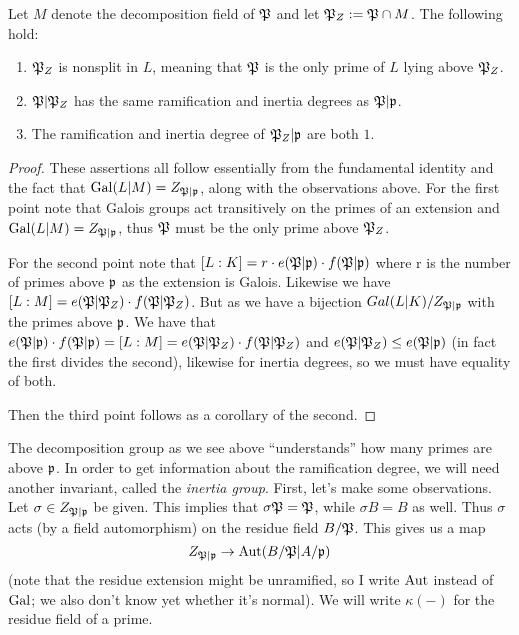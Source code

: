 \begin{proposition}
  Let $M$ denote the decomposition field of $\mathfrak{P}$ and let $\mathfrak{P}_{Z} := \mathfrak{P} \cap M$.
  The following hold:
  \begin{enumerate}
    \item $\mathfrak{P}_{Z}$ is nonsplit in $L$, meaning that $\mathfrak{P}$ is the only prime of $L$ lying above $\mathfrak{P}_{Z}$.
    \item $\mathfrak{P}|\mathfrak{P}_{Z}$ has the same ramification and inertia degrees as $\mathfrak{P}|\mathfrak{p}$.
    \item The ramification and inertia degree of $\mathfrak{P}_{Z}|\mathfrak{p}$ are both $1$.
  \end{enumerate}
\end{proposition}
\begin{proof}
  These assertions all follow essentially from the fundamental identity and the fact that $\operatorname{Gal}(L|M) = Z_{\mathfrak{P}|\mathfrak{p}}$, along with the observations above.
  For the first point note that Galois groups act transitively on the primes of an extension and $\operatorname{Gal}(L|M) = Z_{\mathfrak{P}|\mathfrak{p}}$, 
  thus $\mathfrak{P}$ must be the only prime above $\mathfrak{P}_{Z}$.
  
  For the second point note that $[L:K] = r\cdot e(\mathfrak{P}|\mathfrak{p})\cdot f(\mathfrak{P}|\mathfrak{p})$ where r is the number of primes above 
  $\mathfrak{p}$ as the extension is Galois. Likewise we have $[L:M] = e(\mathfrak{P}|\mathfrak{P}_{Z})\cdot f(\mathfrak{P}|\mathfrak{P}_{Z})$.
  But as we have a bijection $Gal(L|K)/Z_{\mathfrak{P}|\mathfrak{p}}$ with the primes above $\mathfrak{p}$.
  We have that $e(\mathfrak{P}|\mathfrak{p})\cdot f(\mathfrak{P}|\mathfrak{p}) = [L:M] = e(\mathfrak{P}|\mathfrak{P}_{Z})\cdot f(\mathfrak{P}|\mathfrak{P}_{Z})$ and
  $e(\mathfrak{P}|\mathfrak{P}_{Z}) \le e(\mathfrak{P}|\mathfrak{p})$ (in fact the first divides the second), likewise for inertia degrees, so we must have equality of both.

  Then the third point follows as a corollary of the second.
\end{proof}

The decomposition group as we see above ``understands'' how many primes are above $\mathfrak{p}$.
In order to get information about the ramification degree, we will need another invariant, called the \emph{inertia group}.
First, let's make some observations.
Let $\sigma \in Z_{\mathfrak{P}|\mathfrak{p}}$ be given.
This implies that $\sigma \mathfrak{P} = \mathfrak{P}$, while $\sigma B = B$ as well.
Thus $\sigma$ acts (by a field automorphism) on the residue field $B/\mathfrak{P}$.
This gives us a map
\[ Z_{\mathfrak{P}|\mathfrak{p}} \to \operatorname{Aut}(B/\mathfrak{P}|A/\mathfrak{p}) \]
(note that the residue extension might be unramified, so I write $\operatorname{Aut}$ instead of $\operatorname{Gal}$; we also don't know yet whether it's normal).
We will write $\kappa(-)$ for the residue field of a prime.

